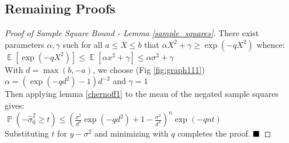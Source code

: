 \documentclass[runningheads, envcountsame, a4paper]{llncs}
\DeclareMathOperator{\E}{\mathbb{E}}
\DeclareMathOperator{\p}{\mathbb{P}}
\begin{document}
\subsection{Remaining Proofs}\label{appendix:B}

\begin{proof}[Proof of Sample Square Bound - Lemma \ref{sample_squares}]
There exist parameters $\alpha,\gamma$ such for all $a\le X\le b$ that $\alpha X^2 + \gamma \ge \exp(-qX^2)$ whence:\\
\-\hspace{3mm}\(\E[\exp(-qX^2)] \le \E[\alpha x^2 +\gamma] \le \alpha\sigma^2 + \gamma \)\\
With $d=\max(b,-a)$, we choose (Fig \ref{fig:graph111}) $\alpha=(\exp(-qd^2)-1)d^{-2}$ and $\gamma=1$\\
Then applying lemma \ref{chernoff1} to the mean of the negated sample squares gives:\\
\-\hspace{3mm}\(
\p(-\hat{\sigma}_0^2\ge t) \le \left(\frac{\sigma^2}{d^2}\exp(-qd^2)+1-\frac{\sigma^2}{d^2}\right)^n\exp(-qnt) 
\)\\
Substituting $t$ for $y-\sigma^2$ and minimizing with $q$ completes the proof.
$\hfill\blacksquare$
\end{proof}
\end{document}
